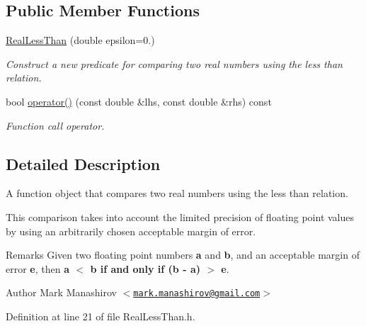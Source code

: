 \subsection*{\-Public \-Member \-Functions}
\begin{DoxyCompactItemize}
\item 
\hyperlink{classmetrobotics_1_1RealLessThan_acee61b8d9e097329706d4b825fdade7a}{\-Real\-Less\-Than} (double epsilon=0.)
\begin{DoxyCompactList}\small\item\em \-Construct a new predicate for comparing two real numbers using the less than relation. \end{DoxyCompactList}\item 
bool \hyperlink{classmetrobotics_1_1RealLessThan_a29b8bb8ab4ac0576d1472af259885382}{operator()} (const double \&lhs, const double \&rhs) const 
\begin{DoxyCompactList}\small\item\em \-Function call operator. \end{DoxyCompactList}\end{DoxyCompactItemize}


\subsection{\-Detailed \-Description}
\-A function object that compares two real numbers using the less than relation. 

\-This comparison takes into account the limited precision of floating point values by using an arbitrarily chosen acceptable margin of error.

\begin{DoxyRemark}{\-Remarks}
\-Given two floating point numbers {\bfseries a} and {\bfseries b}, and an acceptable margin of error {\bfseries e}, then {\bfseries a $<$ b if and only if (b -\/ a) $>$ e}.
\end{DoxyRemark}
\begin{DoxyAuthor}{\-Author}
\-Mark \-Manashirov $<$\href{mailto:mark.manashirov@gmail.com}{\tt mark.\-manashirov@gmail.\-com}$>$ 
\end{DoxyAuthor}


\-Definition at line 21 of file \-Real\-Less\-Than.\-h.



